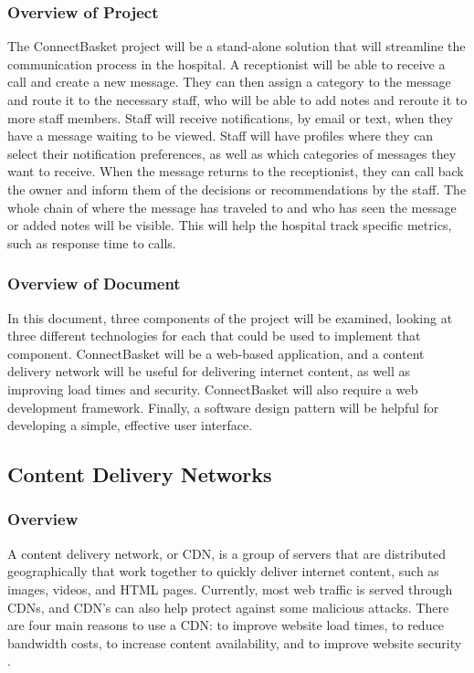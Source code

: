 \documentclass[onecolumn, draftclsnofoot,10pt, compsoc]{IEEEtran}
\begin{document}
\subsubsection{Overview of Project}
The ConnectBasket project will be a stand-alone solution that will streamline the communication process in the hospital. A receptionist will be able to receive a call and create a new message. They can then assign a category to the message and route it to the necessary staff, who will be able to add notes and reroute it to more staff members. Staff will receive notifications, by email or text, when they have a message waiting to be viewed. Staff will have profiles where they can select their notification preferences, as well as which categories of messages they want to receive. When the message returns to the receptionist, they can call back the owner and inform them of the decisions or recommendations by the staff. The whole chain of where the message has traveled to and who has seen the message or added notes will be visible. This will help the hospital track specific metrics, such as response time to calls. 

\subsubsection{Overview of Document}
In this document, three components of the project will be examined, looking at three different technologies for each that could be used to implement that component. ConnectBasket will be a web-based application, and a content delivery network will be useful for delivering internet content, as well as improving load times and security. ConnectBasket will also require a web development framework. Finally, a software design pattern will be helpful for developing a simple, effective user interface. 


\subsection{Content Delivery Networks}

\subsubsection{Overview}
A content delivery network, or CDN, is a group of servers that are distributed geographically that work together to quickly deliver internet content, such as images, videos, and HTML pages. Currently, most web traffic is served through CDNs, and CDN's can also help protect against some malicious attacks. There are four main reasons to use a CDN: to improve website load times, to reduce bandwidth costs, to increase content availability, and to improve website security \cite{cdn}. 
\end{document}
